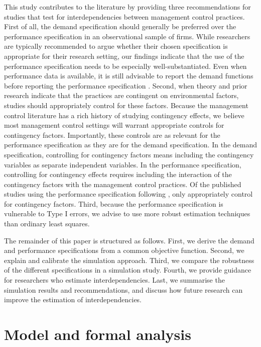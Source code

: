 \documentclass[12pt]{article}
\begin{document}
This study contributes to the literature by providing three recommendations for studies that test for interdependencies between management control practices. First of all, the demand specification should generally be preferred over the performance specification in an observational sample of firms. While researchers are typically recommended to argue whether their chosen specification is appropriate for their research setting, our findings indicate that the use of the performance specification needs to be especially well-substantiated. Even when performance data is available, it is still advisable to report the demand functions before reporting the performance specification \citep{aral_three-way_2012, cassiman_search_2006}. Second, when theory and prior research indicate that the practices are contingent on environmental factors, studies should appropriately control for these factors. Because the management control literature has a rich history of studying contingency effects, we believe most management control settings will warrant appropriate controls for contingency factors. Importantly, these controls are as relevant for the performance specification as they are for the demand specification. In the demand specification, controlling for contingency factors means including the contingency variables as separate independent variables. In the performance specification, controlling for contingency effects requires including the interaction of the contingency factors with the management control practices. Of the published studies using the performance specification following \citet{grabner_management_2013}, only \citet{bedford_management_2016, bedford_performance_2019} appropriately control for contingency factors. Third, because the performance specification is vulnerable to Type I errors, we advise to use more robust estimation techniques than ordinary least squares.

The remainder of this paper is structured as follows. First, we derive the demand and performance specifications from a common objective function. Second, we explain and calibrate the simulation approach. Third, we compare the robustness of the different specifications in a simulation study. Fourth, we provide guidance for researchers who estimate interdependencies. Last, we summarise the simulation results and recommendations, and discuss how future research can improve the estimation of interdependencies.

\section{Model and formal analysis}\label{model-and-formal-analysis}
\end{document}
